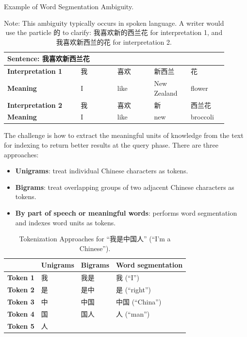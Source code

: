\documentclass[11pt]{article}
\begin{document}
\begin{table}[h!]
    \centering
    \caption{Example of Word Segmentation Ambiguity.}
    \begin{tabular}{p{0.3\linewidth} | p{0.15\linewidth} p{0.15\linewidth} p{0.15\linewidth} p{0.15\linewidth}}
    \toprule
    \multicolumn{5}{l}{\textbf{Sentence}: 我喜欢新西兰花} \\
    \midrule
    \textbf{Interpretation 1} & 我 & 喜欢 & 新西兰 & 花 \\
    \textbf{Meaning} & I & like & New Zealand & flower \\
    \midrule
    \textbf{Interpretation 2} & 我 & 喜欢 & 新 & 西兰花 \\
    \textbf{Meaning} & I & like & new & broccoli \\
    \bottomrule
    \end{tabular}
    \label{tab:segmentation_ambiguity}
    \caption*{Note: This ambiguity typically occurs in spoken language. A writer would use the particle 的 to clarify: 我喜欢新的西兰花 for interpretation 1, and 我喜欢新西兰的花 for interpretation 2.}
\end{table}

The challenge is how to extract the meaningful units of knowledge from the text for indexing to return better results at the query phase. There are three approaches:
\begin{itemize}
    \item \textbf{Unigrams}: treat individual Chinese characters as tokens.
    \item \textbf{Bigrams}: treat overlapping groups of two adjacent Chinese characters as tokens.
    \item \textbf{By part of speech or meaningful words}: performs word segmentation and indexes word units as tokens.
\end{itemize}

\begin{table}[h!]
    \centering
    \caption{Tokenization Approaches for “我是中国人” (“I’m a Chinese”).}
    \begin{tabular}{llll}
    \toprule
    & \textbf{Unigrams} & \textbf{Bigrams} & \textbf{Word segmentation} \\
    \midrule
    \textbf{Token 1} & 我 & 我是 & 我 (“I”) \\
    \textbf{Token 2} & 是 & 是中 & 是 (“right”) \\
    \textbf{Token 3} & 中 & 中国 & 中国 (“China”) \\
    \textbf{Token 4} & 国 & 国人 & 人 (“man”) \\
    \textbf{Token 5} & 人 & & \\
    \bottomrule
    \end{tabular}
    \label{tab:tokenization_approaches}
\end{table}
\end{document}
